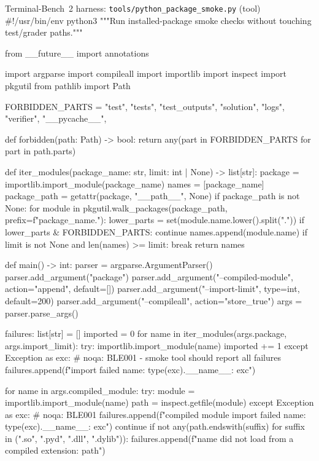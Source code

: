 \documentclass{llmxive}
\begin{document}
\begin{promptbox}{Terminal-Bench~2 harness: \texttt{tools/python\_package\_smoke.py} (tool)}
#!/usr/bin/env python3
"""Run installed-package smoke checks without touching test/grader paths."""

from __future__ import annotations

import argparse
import compileall
import importlib
import inspect
import pkgutil
from pathlib import Path


FORBIDDEN_PARTS = {
    "test",
    "tests",
    "test_outputs",
    "solution",
    "logs",
    "verifier",
    "__pycache__",
}


def forbidden(path: Path) -> bool:
    return any(part in FORBIDDEN_PARTS for part in path.parts)


def iter_modules(package_name: str, limit: int | None) -> list[str]:
    package = importlib.import_module(package_name)
    names = [package_name]
    package_path = getattr(package, "__path__", None)
    if package_path is not None:
        for module in pkgutil.walk_packages(package_path, prefix=f"{package_name}."):
            lower_parts = set(module.name.lower().split("."))
            if lower_parts & FORBIDDEN_PARTS:
                continue
            names.append(module.name)
            if limit is not None and len(names) >= limit:
                break
    return names


def main() -> int:
    parser = argparse.ArgumentParser()
    parser.add_argument("package")
    parser.add_argument("--compiled-module", action="append", default=[])
    parser.add_argument("--import-limit", type=int, default=200)
    parser.add_argument("--compileall", action="store_true")
    args = parser.parse_args()

    failures: list[str] = []
    imported = 0
    for name in iter_modules(args.package, args.import_limit):
        try:
            importlib.import_module(name)
            imported += 1
        except Exception as exc:  # noqa: BLE001 - smoke tool should report all failures
            failures.append(f"import failed {name}: {type(exc).__name__}: {exc}")

    for name in args.compiled_module:
        try:
            module = importlib.import_module(name)
            path = inspect.getfile(module)
        except Exception as exc:  # noqa: BLE001
            failures.append(f"compiled module import failed {name}: {type(exc).__name__}: {exc}")
            continue
        if not any(path.endswith(suffix) for suffix in (".so", ".pyd", ".dll", ".dylib")):
            failures.append(f"{name} did not load from a compiled extension: {path}")


\end{promptbox}
\end{document}
